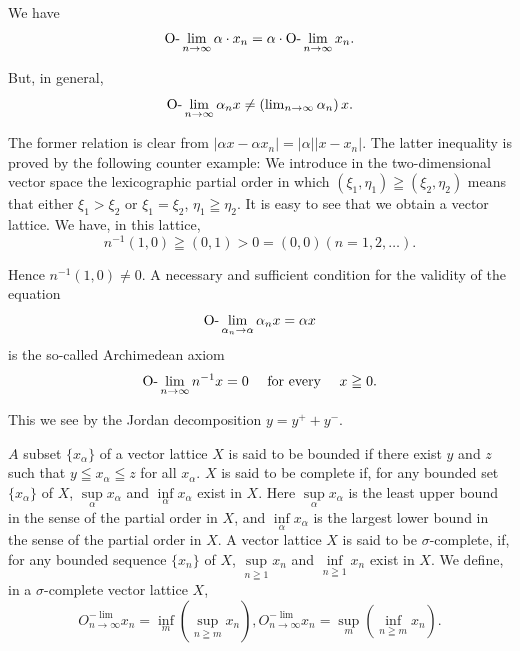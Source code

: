 \begin{remarku} We have 
\[
\text{O-}\lim _{n \to \infty} \alpha \cdot x _{n} = \alpha \cdot \text{O-}\lim _{n \to \infty} x _{n}.
\]
\end{remarku}

But, in general, 
\[
\text{O-}\lim _{n \to \infty} \alpha_{n} x \neq \left(\lim\nolimits _{n \to \infty} \alpha_{n}\right) x.
\]

The former relation is clear from $\left|\alpha x - \alpha x_{n}\right| = \left|\alpha\right| \left|x - x_{n}\right|$. The latter inequality is proved by the following counter example: We introduce in the two-dimensional vector space the lexicographic partial order in which $(\xi_{1}, \eta_{1}) \geqq (\xi_{2}, \eta_{2})$ means that either $\xi_{1} > \xi_{2}$ or $\xi_{1} = \xi_{2}$, $\eta_{1} \geqq \eta_{2}$. It is easy to see that we obtain a vector lattice. We have, in this lattice, 
\[
n ^{-1} (1, 0) \geqq (0, 1) > 0 = (0, 0) (n = 1, 2, \dots).
\]

Hence \Olim $n^{-1}(1,0) \neq 0$. A necessary and sufficient condition for the validity of the equation 
\begin{equation}\label{eq:XII.2.24}
\text{O-}\lim _ {\alpha_{n} \rightarrow \alpha} \alpha_{n} x = \alpha x
\end{equation}
is the so-called Archimedean axiom 
\begin{equation}\label{eq:XII.2.25}
\text{O-}\lim _{n \to \infty} n ^{-1} x = 0 \quad \text{ for every } \quad x \geqq 0.
\end{equation}

This we see by the Jordan decomposition $y = y^{+} + y^{-}$. 

\begin{definition}\label{def:XII.2.Definition.3} $A$ subset $\{x_{\alpha}\}$ of a vector lattice $X$ is said to be bounded if there exist $y$ and $z$ such that $y \leqq x_{\alpha} \leqq z$ for all $x_{\alpha}$. $X$ is said to be complete if, for any bounded set $\{x_{\alpha}\}$ of $X$, $\sup\limits_{\alpha} x_{\alpha}$ and $\inf\limits_{\alpha} x_{\alpha}$ exist in $X$. Here $\sup\limits_{\alpha} x_{\alpha}$ is the least upper bound in the sense of the partial order in $X$, and $\inf\limits_{\alpha} x_{\alpha}$ is the largest lower bound in the sense of the partial order in $X$. A vector lattice $X$ is said to be $\sigma$-complete, if, for any bounded sequence $\{x_{n}\}$ of $X$, $\sup\limits_{n\geqq 1}x_n$ and $\inf\limits_{n\geqq 1}x_n$ exist in $X$. We define, in a $\sigma$-complete vector lattice $X$, 
\begin{equation}\label{eq:XII.2.26}
O _{n \to \infty} ^{- \lim} x _{n} = \inf\limits _{m} \left(\sup\limits _{n \geqq m} x _{n}\right), O _{n \to \infty} ^{- \lim} x _{n} = \sup\limits _{m} \left(\inf\limits _{n \geqq m} x _{n}\right).
\end{equation}
\end{definition}

